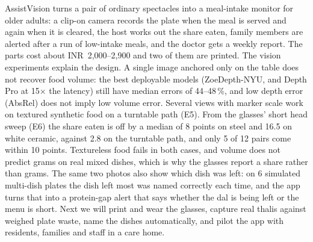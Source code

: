 AssistVision turns a pair of ordinary spectacles into a meal-intake monitor for
older adults: a clip-on camera records the plate when the meal is served and
again when it is cleared, the host works out the share eaten, family members
are alerted after a run of low-intake meals, and the doctor gets a weekly
report. The parts cost about INR~2,000--2,900 and two of them are printed. The
vision experiments explain the design. A single image anchored only on the
table does not recover food volume: the best deployable models (ZoeDepth-NYU,
and Depth Pro at 15$\times$ the latency) still have median errors of
44--48\,\%, and low depth error (AbsRel) does not imply low volume error.
Several views with marker scale work on textured synthetic food on a
turntable path (E5). From the glasses' short head sweep (E6) the share eaten is off
by a median of 8 points on steel and 16.5 on white ceramic, against 2.8 on the
turntable path, and only 5 of 12 pairs come within 10 points. Textureless food fails in both cases, and
volume does not predict grams on real mixed dishes, which is why the glasses
report a share rather than grams. The same two photos also show which dish
was left: on 6 simulated multi-dish plates the dish left most was named
correctly each time, and the app turns that into a protein-gap alert that says
whether the dal is being left or the menu is short. Next we will print and wear
the glasses, capture real thalis against weighed plate waste, name the dishes
automatically, and pilot the app with residents, families and staff in a care
home.
